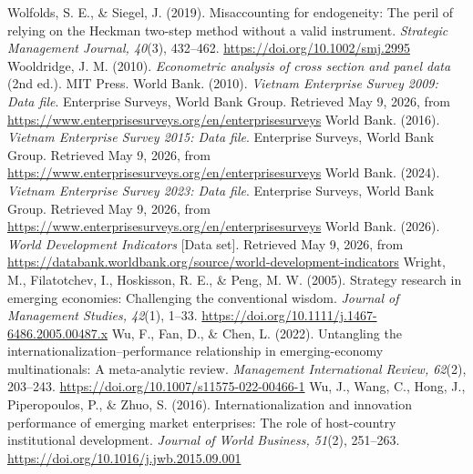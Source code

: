 \documentclass[12pt,a4paper]{article}
\begin{document}
Wolfolds, S. E., \& Siegel, J. (2019). Misaccounting for endogeneity:
The peril of relying on the Heckman two-step method without a valid
instrument. \emph{Strategic Management Journal, 40}(3), 432--462.
\url{https://doi.org/10.1002/smj.2995} Wooldridge, J. M. (2010).
\emph{Econometric analysis of cross section and panel data} (2nd ed.).
MIT Press. World Bank. (2010). \emph{Vietnam Enterprise Survey 2009:
Data file}. Enterprise Surveys, World Bank Group. Retrieved May 9, 2026,
from \url{https://www.enterprisesurveys.org/en/enterprisesurveys} World
Bank. (2016). \emph{Vietnam Enterprise Survey 2015: Data file}.
Enterprise Surveys, World Bank Group. Retrieved May 9, 2026, from
\url{https://www.enterprisesurveys.org/en/enterprisesurveys} World Bank.
(2024). \emph{Vietnam Enterprise Survey 2023: Data file}. Enterprise
Surveys, World Bank Group. Retrieved May 9, 2026, from
\url{https://www.enterprisesurveys.org/en/enterprisesurveys} World Bank.
(2026). \emph{World Development Indicators} {[}Data set{]}. Retrieved
May 9, 2026, from
\url{https://databank.worldbank.org/source/world-development-indicators}
Wright, M., Filatotchev, I., Hoskisson, R. E., \& Peng, M. W. (2005).
Strategy research in emerging economies: Challenging the conventional
wisdom. \emph{Journal of Management Studies, 42}(1), 1--33.
\url{https://doi.org/10.1111/j.1467-6486.2005.00487.x} Wu, F., Fan, D.,
\& Chen, L. (2022). Untangling the internationalization--performance
relationship in emerging-economy multinationals: A meta-analytic review.
\emph{Management International Review, 62}(2), 203--243.
\url{https://doi.org/10.1007/s11575-022-00466-1} Wu, J., Wang, C., Hong,
J., Piperopoulos, P., \& Zhuo, S. (2016). Internationalization and
innovation performance of emerging market enterprises: The role of
host-country institutional development. \emph{Journal of World Business,
51}(2), 251--263. \url{https://doi.org/10.1016/j.jwb.2015.09.001}
\end{document}
